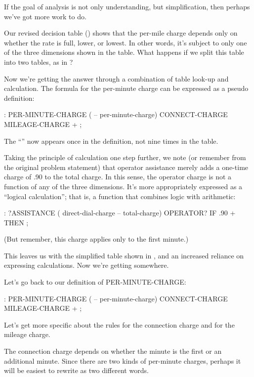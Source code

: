 \noindent If the goal of analysis is not only understanding, but
simplification, then perhaps we've got more work to do.

Our revised decision table () shows that the per-mile
charge depends only on whether the rate is full, lower, or lowest. In
other words, it's subject to only one of the three dimensions shown in
the table.  What happens if we split this table into two tables, as in
?


Now we're getting the answer through a combination of table look-up
and calculation. The formula for the per-minute charge can be
expressed as a pseudo\Forth{} definition:

\begin{Code}
: PER-MINUTE-CHARGE ( -- per-minute-charge)
        CONNECT-CHARGE  MILEAGE-CHARGE  + ;
\end{Code}
The ``\forth{+}'' now appears once in the definition,
not nine times in the table.

Taking the principle of calculation one step further, we note (or
remember from the original problem statement) that operator assistance
merely adds a one-time charge of .90 to the total charge. In this
sense, the operator charge is not a function of any of the three
dimensions. It's more
appropriately expressed as a ``logical calculation''; that is, a
function that combines logic with arithmetic:

\begin{Code}
: ?ASSISTANCE
   ( direct-dial-charge -- total-charge)
   OPERATOR? IF .90 + THEN ;
\end{Code}
(But remember, this charge applies only to the first minute.)


This leaves us with the simplified table shown in , and an
increased reliance on expressing calculations. Now we're getting
somewhere.

Let's go back to our definition of PER-MINUTE-CHARGE:
\begin{Code}
: PER-MINUTE-CHARGE ( -- per-minute-charge)
   CONNECT-CHARGE  MILEAGE-CHARGE  + ;
\end{Code}
Let's get more specific about the rules for the connection charge and for
the mileage charge.

The connection charge depends on whether the minute is the first or
an additional minute. Since there are two kinds of per-minute charges,
perhaps it will be easiest to rewrite  as two
different words.

